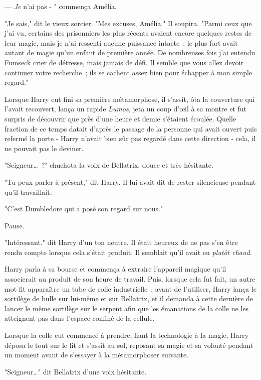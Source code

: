 --- \emph{Je} n'ai pas - " commença Amélia.

"Je sais," dit le vieux sorcier. "Mes excuses, Amélia." Il soupira. "Parmi ceux que j'ai vu, certains des prisonniers les plus récents avaient encore quelques restes de leur magie, mais je n'ai ressenti aucune puissance intacte~; le plus fort avait autant de magie qu'un enfant de première année. De nombreuses fois j'ai entendu Fumseck crier de détresse, mais jamais de défi. Il semble que vous allez devoir continuer votre recherche~; ils se cachent assez bien pour échapper à mon simple regard."

\later

Lorsque Harry eut fini sa première métamorphose, il s'assit, ôta la couverture qui l'avait recouvert, lança un rapide \emph{Lumos}, jeta un coup d'œil à sa montre et fut surpris de découvrir que près d'une heure et demie s'étaient écoulée. Quelle fraction de ce temps datait d'après le passage de la personne qui avait ouvert puis refermé la porte - Harry n'avait bien sûr pas regardé dans cette direction - cela, il ne pouvait pas le deviner.

"Seigneur…~?" chuchota la voix de Bellatrix, douce et très hésitante.

"Tu peux parler à présent," dit Harry. Il lui avait dit de rester silencieuse pendant qu'il travaillait.

"C'est Dumbledore qui a posé son regard sur nous."

Pause.

"Intéressant." dit Harry d'un ton neutre. Il était heureux de ne pas s'en être rendu compte lorsque cela s'était produit. Il semblait qu'il avait eu \emph{plutôt chaud}.

Harry parla à sa bourse et commença à extraire l'appareil magique qu'il associerait au produit de son heure de travail. Puis, lorsque cela fut fait, un autre mot fit apparaître un tube de colle industrielle~; avant de l'utiliser, Harry lança le sortilège de bulle sur lui-même et sur Bellatrix, et il demanda à cette dernière de lancer le même sortilège sur le serpent afin que les émanations de la colle ne les atteignent pas dans l'espace confiné de la cellule.

Lorsque la colle eut commencé à prendre, liant la technologie à la magie, Harry déposa le tout sur le lit et s'assit au sol, reposant sa magie et sa volonté pendant un moment avant de s'essayer à la métamorphoser suivante.

"Seigneur…" dit Bellatrix d'une voix hésitante.

